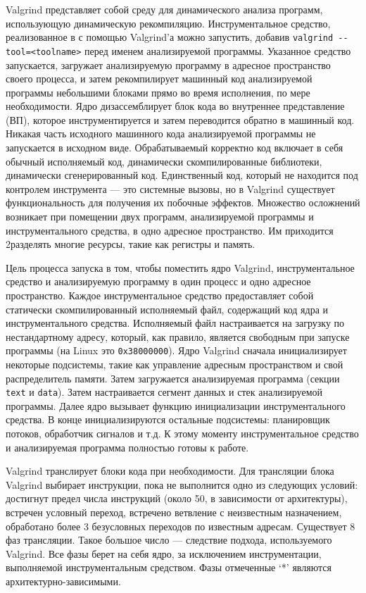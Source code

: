 \documentclass[a4paper,12pt,russian]{article}
\begin{document}
Valgrind представляет собой среду для динамического анализа программ, использующую динамическую рекомпиляцию.
Инструментальное средство, реализованное в с помощью Valgrind'а можно запустить, добавив \texttt{valgrind -{}-tool=<toolname>} перед именем анализируемой программы. Указанное средство запускается, загружает анализируемую программу в адресное пространство своего процесса, и затем рекомпилирует машинный код анализируемой программы небольшими блоками прямо во время исполнения, по мере необходимости.
Ядро дизассемблирует блок кода во внутреннее представление (ВП), которое инструментируется и затем переводится обратно в машинный код.
Никакая часть исходного машинного кода анализируемой программы не запускается в исходном виде. Обрабатываемый корректно код включает в себя обычный исполняемый код, динамически скомпилированные библиотеки, динамически сгенерированный код. Единственный код, который не находится под контролем инструмента --- это системные вызовы, но в Valgrind существует функциональность для получения их побочные эффектов. Множество осложнений возникает при помещении двух программ, анализируемой программы и инструментального средства, в одно адресное пространство. Им приходится 2разделять многие ресурсы, такие как регистры и память.

Цель процесса запуска в том, чтобы поместить ядро Valgrind, инструментальное средство и анализируемую программу в один процесс и одно адресное пространство. Каждое инструментальное средство предоставляет собой статически скомпилированный исполняемый файл, содержащий код ядра и инструментального средства. Исполняемый файл настраивается на загрузку по нестандартному адресу, который, как правило, является свободным при запуске программы (на Linux это \texttt{0x38000000}). Ядро Valgrind сначала инициализирует некоторые подсистемы, такие как управление адресным пространством и свой распределитель памяти. Затем загружается анализируемая программа (секции \texttt{text} и \texttt{data}). Затем настраивается сегмент данных и стек анализируемой программы. Далее ядро вызывает функцию инициализации инструментального средства. В конце инициализируются остальные подсистемы: планировщик потоков, обработчик сигналов и т.д. К этому моменту инструментальное средство и анализируемая программа полностью готовы к работе.

Valgrind транслирует блоки кода при необходимости. Для трансляции блока Valgrind выбирает инструкции, пока не выполнится одно из следующих условий: достигнут предел числа инструкций (около 50, в зависимости от архитектуры), встречен условный переход, встречено ветвление с неизвестным назначением, обработано более 3 безусловных переходов по известным адресам. Существует 8 фаз трансляции. Такое большое число --- следствие подхода, используемого Valgrind. Все фазы берет на себя ядро, за исключением инструментации, выполняемой инструментальным средством. Фазы отмеченные `*' являются архитектурно-зависимыми.
\end{document}
